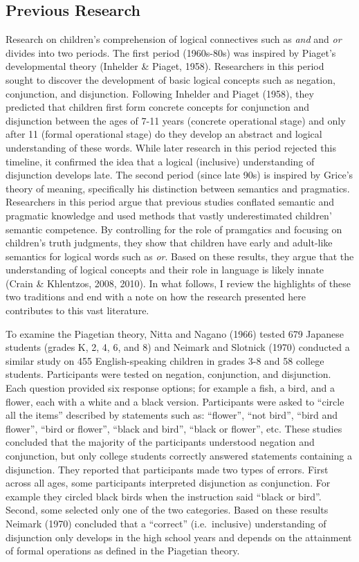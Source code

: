 \documentclass[floatsintext,man]{apa6}
\theoremstyle{definition}
\theoremstyle{definition}
\theoremstyle{definition}
\theoremstyle{remark}
\begin{document}
\subsection{Previous Research}\label{previous-research}

Research on children's comprehension of logical connectives such as
\emph{and} and \emph{or} divides into two periods. The first period
(1960s-80s) was inspired by Piaget's developmental theory (Inhelder \&
Piaget, 1958). Researchers in this period sought to discover the
development of basic logical concepts such as negation, conjunction, and
disjunction. Following Inhelder and Piaget (1958), they predicted that
children first form concrete concepts for conjunction and disjunction
between the ages of 7-11 years (concrete operational stage) and only
after 11 (formal operational stage) do they develop an abstract and
logical understanding of these words. While later research in this
period rejected this timeline, it confirmed the idea that a logical
(inclusive) understanding of disjunction develops late. The second
period (since late 90s) is inspired by Grice's theory of meaning,
specifically his distinction between semantics and pragmatics.
Researchers in this period argue that previous studies conflated
semantic and pragmatic knowledge and used methods that vastly
underestimated children' semantic competence. By controlling for the
role of pramgatics and focusing on children's truth judgments, they show
that children have early and adult-like semantics for logical words such
as \emph{or}. Based on these results, they argue that the understanding
of logical concepts and their role in language is likely innate (Crain
\& Khlentzos, 2008, 2010). In what follows, I review the highlights of
these two traditions and end with a note on how the research presented
here contributes to this vast literature.

To examine the Piagetian theory, Nitta and Nagano (1966) tested 679
Japanese students (grades K, 2, 4, 6, and 8) and Neimark and Slotnick
(1970) conducted a similar study on 455 English-speaking children in
grades 3-8 and 58 college students. Participants were tested on
negation, conjunction, and disjunction. Each question provided six
response options; for example a fish, a bird, and a flower, each with a
white and a black version. Participants were asked to \enquote{circle
all the items} described by statements such as: \enquote{flower},
\enquote{not bird}, \enquote{bird and flower}, \enquote{bird or flower},
\enquote{black and bird}, \enquote{black or flower}, etc. These studies
concluded that the majority of the participants understood negation and
conjunction, but only college students correctly answered statements
containing a disjunction. They reported that participants made two types
of errors. First across all ages, some participants interpreted
disjunction as conjunction. For example they circled black birds when
the instruction said \enquote{black or bird}. Second, some selected only
one of the two categories. Based on these results Neimark (1970)
concluded that a \enquote{correct} (i.e.~inclusive) understanding of
disjunction only develops in the high school years and depends on the
attainment of formal operations as defined in the Piagetian theory.
\end{document}
